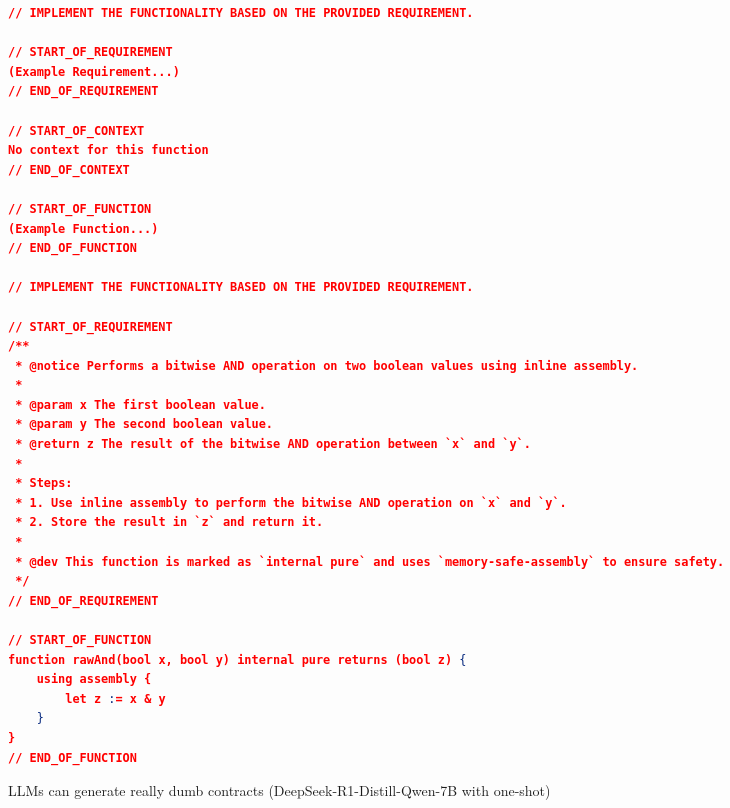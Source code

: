 \begin{figure*}[htbp]
\centering
\begin{lstlisting}[language=json, firstnumber=1, xleftmargin=5.0ex]
// IMPLEMENT THE FUNCTIONALITY BASED ON THE PROVIDED REQUIREMENT.

// START_OF_REQUIREMENT
(Example Requirement...)
// END_OF_REQUIREMENT

// START_OF_CONTEXT
No context for this function
// END_OF_CONTEXT

// START_OF_FUNCTION
(Example Function...)
// END_OF_FUNCTION

// IMPLEMENT THE FUNCTIONALITY BASED ON THE PROVIDED REQUIREMENT.

// START_OF_REQUIREMENT
/**
 * @notice Performs a bitwise AND operation on two boolean values using inline assembly.
 *
 * @param x The first boolean value.
 * @param y The second boolean value.
 * @return z The result of the bitwise AND operation between `x` and `y`.
 *
 * Steps:
 * 1. Use inline assembly to perform the bitwise AND operation on `x` and `y`.
 * 2. Store the result in `z` and return it.
 *
 * @dev This function is marked as `internal pure` and uses `memory-safe-assembly` to ensure safety.
 */
// END_OF_REQUIREMENT

// START_OF_FUNCTION
function rawAnd(bool x, bool y) internal pure returns (bool z) {
    using assembly {
        let z := x & y
    }
}
// END_OF_FUNCTION
\end{lstlisting}
\caption{LLMs can generate really dumb contracts (DeepSeek-R1-Distill-Qwen-7B with one-shot)}
\label{fig:LLMs can generate really dumb contracts}
\end{figure*}
